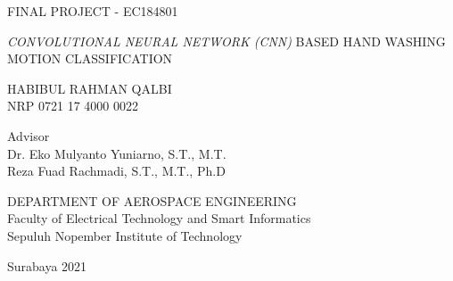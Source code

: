 FINAL PROJECT - EC184801

\vspace{6ex}

\begin{large}
  \emph{CONVOLUTIONAL NEURAL NETWORK (CNN)} BASED HAND WASHING MOTION CLASSIFICATION
\end{large}

\vspace{4ex}

HABIBUL RAHMAN QALBI \\
NRP 0721 17 4000 0022

\vspace{2ex}

Advisor \\
Dr. Eko Mulyanto Yuniarno, S.T., M.T. \\
Reza Fuad Rachmadi, S.T., M.T., Ph.D


\vspace{6ex}

DEPARTMENT OF AEROSPACE ENGINEERING \\
Faculty of Electrical Technology and Smart Informatics \\
Sepuluh Nopember Institute of Technology

Surabaya 2021
